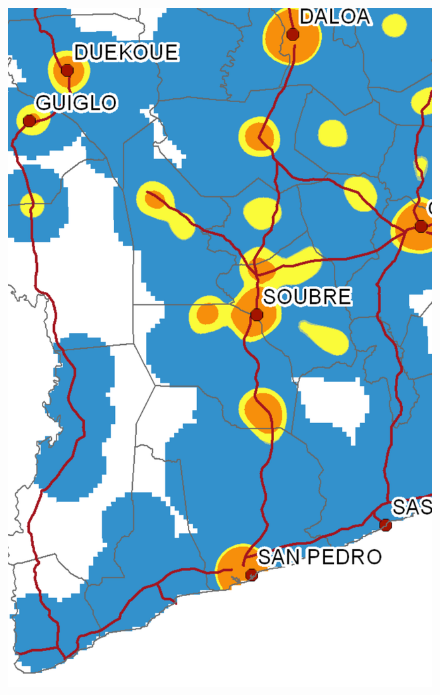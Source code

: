 \begin{figure}
{    \includegraphics[scale = 0.15]{results/images/kernel/l_hour18_kd_detail.pdf}
	\label{fig:subfig2_detail}
}
\subfigure[Wednesday, 19:00]{
}
\end{figure}
